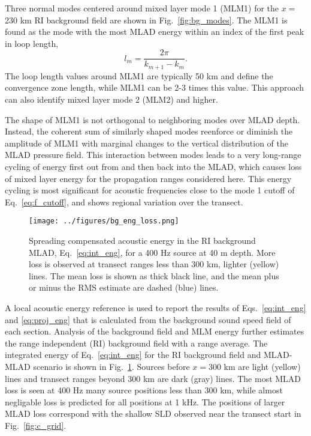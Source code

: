 \documentclass[preprint,NumberedRefs]{JASA}
\begin{document}
Three normal modes centered around mixed layer mode 1 (MLM1) for the $x=$230 km RI background field are shown in Fig.~\ref{fig:bg_modes}. The MLM1 is found as the mode with the most MLAD energy within an index of the first peak in loop length\citep{jensen2011computational},
\begin{equation}
    l_{m} = \frac{2 \pi}{k_{m+1} - k_m}.
    \label{eq:loop_length}
\end{equation}
The loop length values around MLM1 are typically 50 km and define the convergence zone length, while MLM1 can be 2-3 times this value. This approach can also identify mixed layer mode 2 (MLM2) and higher.

The shape of MLM1 is not orthogonal to neighboring modes over MLAD depth. Instead, the coherent sum of similarly shaped modes reenforce or diminish the amplitude of MLM1 with marginal changes to the vertical distribution of the MLAD pressure field. This interaction between modes leads to a very long-range cycling of energy first out from and then back into the MLAD\citep{porter93,colosi2020observations}, which causes loss of mixed layer energy for the propagation ranges considered here. This energy cycling is most significant for acoustic frequencies close to the mode 1 cutoff of Eq.~\eqref{eq:f_cutoff}, and shows regional variation over the transect.

\begin{figure}
\texttt{[image: ../figures/bg\_eng\_loss.png]}
    \caption{Spreading compensated acoustic energy in the RI background MLAD, Eq.~\eqref{eq:int_eng}, for a 400 Hz source at 40 m depth. More loss is observed at transect ranges less than 300 km, lighter (yellow) lines. The mean loss is shown as thick black line, and the mean plus or minus the RMS estimate are dashed (blue) lines.}
    \label{fig:bg_eng}
\end{figure}
A local acoustic energy reference is used to report the results of Eqs.~\ref{eq:int_eng} and \ref{eq:proj_eng} that is calculated from the background sound speed field of each section. Analysis of the background field and MLM energy further estimates the range independent (RI) background field with a range average. The integrated energy of Eq.~\eqref{eq:int_eng} for the RI background field and MLAD-MLAD scenario is shown in Fig.~\ref{fig:bg_eng}. Sources before $x=$300 km are light (yellow) lines and transect ranges beyond 300 km are dark (gray) lines. The most MLAD loss is seen at 400 Hz many source positions less than 300 km, while almost negligable loss is predicted for all positions at 1 kHz. The positions of larger MLAD loss correspond with the shallow SLD observed near the transect start in Fig.~\ref{fig:c_grid}.
\end{document}
